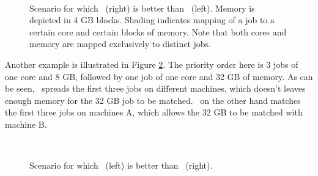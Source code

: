 \begin{figure}\centering
{}
~~~~
\caption{Scenario for which \wof\ (right) is better than \bef\ (left).
  Memory is depicted in 4 GB blocks.
  Shading indicates mapping of a job to a certain core and certain
  blocks of memory.
  Note that both cores and memory are mapped exclusively to distinct
  jobs.}
\label{fig:wf_better}
\end{figure}

Another example is illustrated in Figure \ref{fig:bf_better}.
The priority order here is 3 jobs of one core and 8 GB, followed by
one job of one core and 32 GB of memory.
As can be seen, \wof\ spreads the first three jobs on different
machines, which doesn't leaves enough memory for the 32 GB job to be
matched.
\bef\ on the other hand matches the first three jobs on machines A, 
which allows the 32 GB to be matched with machine B.

\begin{figure}\centering
{}
~~~~
\caption{Scenario for which \bef\ (left) is better than \wof\ (right). }
\label{fig:bf_better}
\end{figure}


